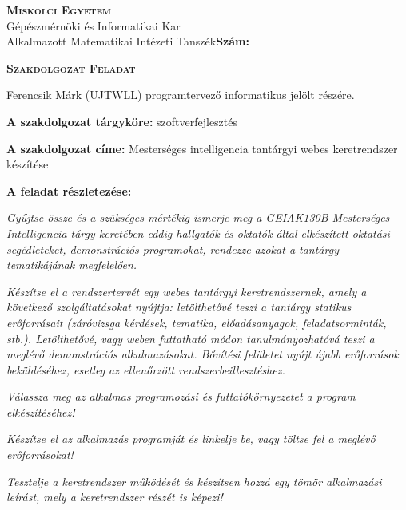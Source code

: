 \begin{flushleft}
    \textsc{\bfseries Miskolci Egyetem}\\
    Gépészmérnöki és Informatikai Kar\\
    Alkalmazott Matematikai Intézeti Tanszék\hspace*{4cm}\hfil \textbf{Szám:}
    \end{flushleft}
    \vskip 0.5cm
    \begin{center}
    \large\textsc{\bfseries Szakdolgozat Feladat}
    \end{center}
    \vskip 0.5cm
    Ferencsik Márk (UJTWLL) programtervező informatikus jelölt részére.\newline
    
    \noindent\textbf{A szakdolgozat tárgyköre:} szoftverfejlesztés\newline
    
    \noindent\textbf{A szakdolgozat címe:} Mesterséges intelligencia tantárgyi webes keretrendszer készítése\newline
    
    \noindent\textbf{A feladat részletezése:}
    
    \medskip
    
    \emph{Gyűjtse össze és a szükséges mértékig ismerje meg a GEIAK130B Mesterséges Intelligencia tárgy keretében eddig hallgatók és oktatók által elkészített oktatási segédleteket, demonstrációs programokat, rendezze azokat a tantárgy tematikájának megfelelően.}
    
    \emph{Készítse el a rendszertervét egy webes tantárgyi keretrendszernek, amely a következő szolgáltatásokat nyújtja: letölthetővé teszi a tantárgy statikus erőforrásait (záróvizsga kérdések, tematika, előadásanyagok, feladatsorminták, stb.). Letölthetővé, vagy weben futtatható módon tanulmányozhatóvá teszi a meglévő demonstrációs alkalmazásokat. Bővítési felületet nyújt újabb erőforrások beküldéséhez, esetleg az ellenőrzött rendszerbeillesztéshez.}
    
    \emph{Válassza meg az alkalmas programozási és futtatókörnyezetet a program elkészítéséhez!}
    
    \emph{Készítse el az alkalmazás programját és linkelje be, vagy töltse fel a meglévő erőforrásokat!}
    
    \emph{Tesztelje a keretrendszer működését és készítsen hozzá egy tömör alkalmazási leírást, mely a keretrendszer részét is képezi!}
    
    \vfill
    
